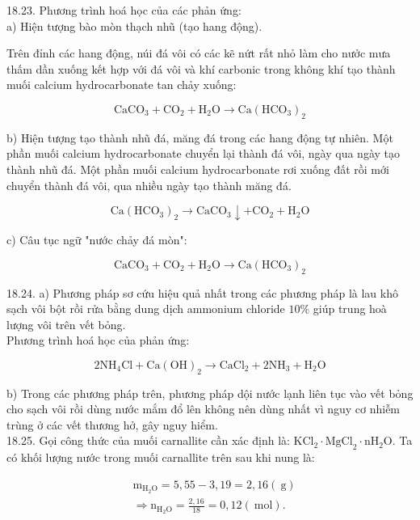 \documentclass[10pt]{article}
\begin{document}
18.23. Phương trình hoá học của các phản ứng:\\
a) Hiện tượng bào mòn thạch nhũ (tạo hang động).

Trên đỉnh các hang động, núi đá vôi có các kẽ nứt rất nhỏ làm cho nưởc mưa thấm dần xuống kết hợp với đá vôi và khí carbonic trong không khí tạo thành muối calcium hydrocarbonate tan chảy xuống:

$$
\mathrm{CaCO}_{3}+\mathrm{CO}_{2}+\mathrm{H}_{2} \mathrm{O} \rightarrow \mathrm{Ca}\left(\mathrm{HCO}_{3}\right)_{2}
$$

b) Hiện tượng tạo thành nhũ đá, măng đá trong các hang động tự nhiên. Một phần muối calcium hydrocarbonate chuyển lại thành đá vôi, ngày qua ngày tạo thành nhũ đá. Một phần muối calcium hydrocarbonate rơi xuống đất rồi mới chuyển thành đá vôi, qua nhiều ngày tạo thành măng đá.

$$
\mathrm{Ca}\left(\mathrm{HCO}_{3}\right)_{2} \rightarrow \mathrm{CaCO}_{3} \downarrow+\mathrm{CO}_{2}+\mathrm{H}_{2} \mathrm{O}
$$

c) Câu tục ngữ "nước chảy đá mòn":

$$
\mathrm{CaCO}_{3}+\mathrm{CO}_{2}+\mathrm{H}_{2} \mathrm{O} \rightarrow \mathrm{Ca}\left(\mathrm{HCO}_{3}\right)_{2}
$$

18.24. a) Phương pháp sơ cứu hiệu quả nhất trong các phương pháp là lau khô sạch vôi bột rồi rửa bằng dung dịch ammonium chloride $10 \%$ giúp trung hoà lượng vôi trên vết bỏng.\\
Phương trình hoá học của phản ứng:

$$
2 \mathrm{NH}_{4} \mathrm{Cl}+\mathrm{Ca}(\mathrm{OH})_{2} \rightarrow \mathrm{CaCl}_{2}+2 \mathrm{NH}_{3}+\mathrm{H}_{2} \mathrm{O}
$$

b) Trong các phương pháp trên, phương pháp dội nước lạnh liên tục vào vết bỏng cho sạch vôi rồi dùng nước mắm đổ lên không nên dùng nhất vì nguy cơ nhiễm trùng ở các vết thương hở, gây nguy hiểm.\\
18.25. Gọi công thức của muối carnallite cần xác định là: $\mathrm{KCl}_{2} \cdot \mathrm{MgCl}_{2} \cdot \mathrm{n} \mathrm{H}_{2} \mathrm{O}$. Ta có khối lượng nước trong muối carnallite trên sau khi nung là:

$$
\begin{aligned}
& \mathrm{m}_{\mathrm{H}_{2} \mathrm{O}}=5,55-3,19=2,16(\mathrm{~g}) \\
& \Rightarrow \mathrm{n}_{\mathrm{H}_{2} \mathrm{O}}=\frac{2,16}{18}=0,12(\mathrm{~mol}) .
\end{aligned}
$$
\end{document}
